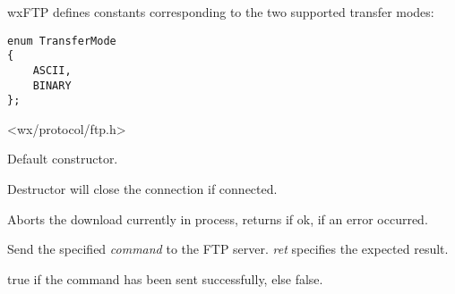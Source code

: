 
wxFTP defines constants corresponding to the two supported transfer modes:

\begin{verbatim}
enum TransferMode
{
    ASCII,
    BINARY
};
\end{verbatim}




<wx/protocol/ftp.h>








\label{wxftpctor}


Default constructor.


\label{wxftpdtor}


Destructor will close the connection if connected.


\label{wxftpabort}


Aborts the download currently in process, returns \true if ok, \false 
if an error occurred.


\label{wxftpcheckcommand}


Send the specified {\it command} to the FTP server. {\it ret} specifies
the expected result.


true if the command has been sent successfully, else false.


\label{wxftpsendcommand}

